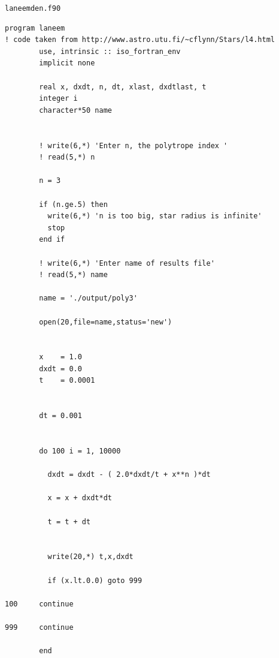 \documentclass[12pt]{article}
\begin{document}
\texttt{laneemden.f90}
\begin{Verbatim}[fontsize=\small]
program laneem
! code taken from http://www.astro.utu.fi/~cflynn/Stars/l4.html
        use, intrinsic :: iso_fortran_env
        implicit none

        real x, dxdt, n, dt, xlast, dxdtlast, t
        integer i
        character*50 name


        ! write(6,*) 'Enter n, the polytrope index '
        ! read(5,*) n

        n = 3

        if (n.ge.5) then
          write(6,*) 'n is too big, star radius is infinite'
          stop
        end if

        ! write(6,*) 'Enter name of results file'
        ! read(5,*) name

        name = './output/poly3'

        open(20,file=name,status='new')


        x    = 1.0
        dxdt = 0.0
        t    = 0.0001


        dt = 0.001


        do 100 i = 1, 10000

          dxdt = dxdt - ( 2.0*dxdt/t + x**n )*dt

          x = x + dxdt*dt

          t = t + dt


          write(20,*) t,x,dxdt

          if (x.lt.0.0) goto 999

100     continue

999     continue

        end
\end{Verbatim}
\end{document}
